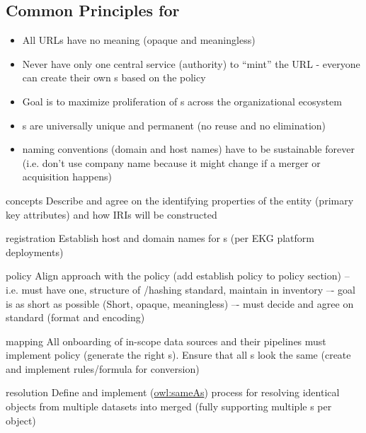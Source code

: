 \subsection*{Common Principles for }

\begin{itemize}
  \item All URLs have no meaning (opaque and meaningless)
  \item Never have only one central service (authority) to “mint” the URL - everyone can create their own
        s based on the policy
  \item Goal is to maximize proliferation of s across the organizational ecosystem
  \item {}s are universally unique and permanent (no reuse and no elimination)
  \item {} naming conventions (domain and host names) have to be sustainable forever
        (i.e. don’t use company name because it might change if a merger or acquisition happens)
\end{itemize}

\kgmmscoringsection

\kgmmscoringlevelOne

\begin{scoring}

  \item [concepts] Describe and agree on the identifying properties of the entity (primary key
        attributes) and how IRIs will be constructed
  \item [registration] Establish host and domain names for s (per EKG platform deployments)
  \item [policy] Align approach with the  policy (add establish policy to policy section) -- i.e.
        must have one, structure of /hashing standard, maintain in inventory –- goal is as short
        as possible (Short, opaque, meaningless) –- must decide and agree on standard (format and encoding)
  \item [mapping] All onboarding of in-scope data sources and their  pipelines must implement policy
        (generate the right s).
        Ensure that all s look the same (create and implement rules/formula for conversion)
  \item [resolution] Define and implement (\href{https://www.w3.org/TR/owl-ref/#sameAs-def}{owl:sameAs}) process for
        resolving identical objects from multiple datasets into merged  (fully supporting
        multiple s per object)

\end{scoring}

